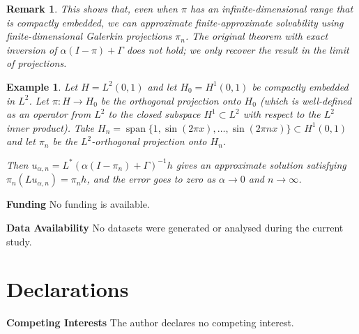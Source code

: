 \documentclass[12pt]{article}
\newtheorem{example}[theorem]{Example}
\newtheorem{remark}[theorem]{Remark}
\DeclareMathOperator{\Span}{span}
\begin{document}
	\begin{remark}
		This shows that, even when \(\pi\) has an infinite-dimensional range that is compactly embedded, we can approximate finite-approximate solvability using finite-dimensional Galerkin projections \(\pi_n\). The original theorem with exact inversion of \(\alpha(I-\pi)+\Gamma\) does not hold; we only recover the result in the limit of projections.
	\end{remark}
	
	\begin{example}
		Let \(H = L^2(0,1)\) and let \(H_0 = H^1(0,1)\) be compactly embedded in \(L^2\). Let \(\pi: H \to H_0\) be the orthogonal projection onto \(H_0\) (which is well-defined as an operator from \(L^2\) to the closed subspace \(H^1 \subset L^2\) with respect to the \(L^2\) inner product). Take \(H_n = \Span\{1, \sin(2\pi x), \dots, \sin(2\pi n x)\} \subset H^1(0,1)\) and let \(\pi_n\) be the \(L^2\)-orthogonal projection onto \(H_n\).
		
		Then \(u_{\alpha,n} = L^* (\alpha(I-\pi_n)+\Gamma)^{-1} h\) gives an approximate solution satisfying \(\pi_n(L u_{\alpha,n}) = \pi_n h\), and the error goes to zero as \(\alpha \to 0\) and \(n \to \infty\).
	\end{example}
	
{\bf Funding} No funding is available.

{\bf Data Availability } No datasets were generated or analysed during the current study.
\section*{Declarations}
{\bf Competing Interests} The author declares no competing interest.
\end{document}
